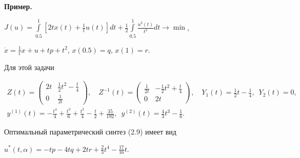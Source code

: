 \medskip





{\bf Пример.}


$J(u)=\int\limits_{0.5}^{1}[2tx(t)+


\frac{1}{t}u(t)]dt+\frac{1}{2}\int\limits_{0.5}^{1}


\frac {u^{2}(t)}{t^{2}}dt \rightarrow \min$,


$\Dot {x}=\frac {1}{t}x+u+tp+t^{2}$, $x(0.5)=q$, $x(1)=r$.


Для этой задачи


\begin{gather*}


Z(t)=


\begin{pmatrix} 2t&\frac {1}{2}t^{2}-\frac {t}{4}\\


0&\frac {1}{2t}


\end{pmatrix},


\quad Z^{-1}(t)=


\begin{pmatrix} \frac {1}{2t}&-\frac {1}{2}t^{2}+\frac {t}{4}\\


0&2t


\end{pmatrix}


,\quad


Y_{1}(t)=\frac {1}{2}t-\frac{1}{4}, \ \; Y_{2}(t)=0, \\


y^{(1)}(t)=-\frac{t^{4}}{4}+\frac {t^{3}}{6}+\frac{t^{2}}{4}


-\frac{t}{2}+\frac {35}{192},


\ \; y^{(2)}(t)=\frac {4}{3}t^{3}-\frac {1}{6}.


\end{gather*}


Оптимальный параметрический синтез (2.9) имеет вид


$u^{\ast }(t,\alpha)=-t p-4t q+2t r+


\frac {2}{3}t^{4}-\frac {17}{16}t$.





